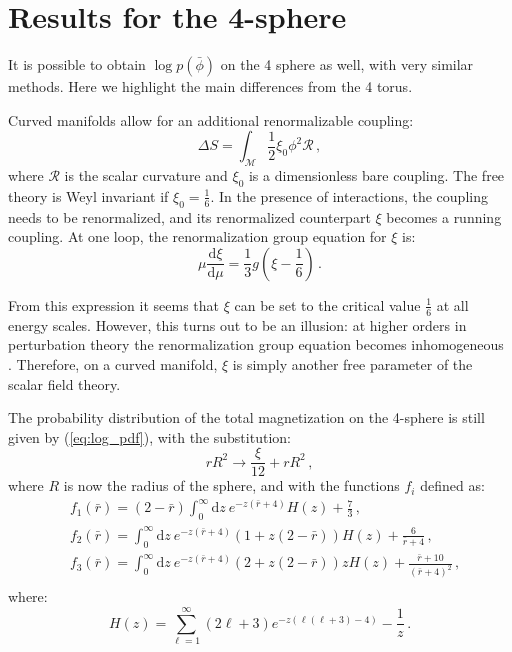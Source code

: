 \documentclass[11pt,a4paper]{article}
\newcommand{\dd}{\mathrm{d}}
\begin{document}
\section{Results for the 4-sphere}
\label{sec:four_sphere}
It is possible to obtain $\log p(\bar{\phi})$ on the 4 sphere as well, with
very similar methods. Here we highlight the main differences from the 4 torus.

Curved manifolds allow for an additional renormalizable coupling: 
\begin{equation}
    \Delta S = \int_{\mathcal{M}} \frac{1}{2}\xi_0 \phi^2 \mathcal{R}\,,
\end{equation}
where $\mathcal{R}$ is the scalar curvature and $\xi_0$ is a dimensionless bare
coupling.  The free theory is Weyl invariant if $\xi_0 = \frac{1}{6}$. In the
presence of interactions, the coupling needs to be renormalized, and its
renormalized counterpart $\xi$ becomes a running coupling. At one loop, the
renormalization group equation for $\xi$ is:
\begin{equation}
    \mu \frac{\dd \xi}{\dd \mu} =  \frac{1}{3} g \left(\xi - \frac{1}{6}\right)\,.
\end{equation}

From this expression it seems that $\xi$ can be set to the critical value
$\frac{1}{6}$ at all energy scales. However, this turns out to be an illusion:
at higher orders in perturbation theory the renormalization group equation
becomes inhomogeneous \cite{Brown1980}. Therefore, on a curved manifold, $\xi$
is simply another free parameter of the scalar field theory.

The probability distribution of the total magnetization on the 4-sphere is
still given by (\ref{eq:log_pdf}), with the substitution:
\begin{equation}
    rR^2 \to \frac{\xi}{12} + r R^2\,,
\end{equation}
where $R$ is now the radius of the sphere, and with the functions $f_i$ defined
as:
\begin{align}
    &f_1(\bar{r}) = (2 - \bar{r})\int_{0}^{\infty} \dd z\ e^{-z(\bar{r} + 4)} H(z) + \frac{7}{3}\,,\\
    &f_2(\bar{r}) = \int_{0}^{\infty} \dd z\ e^{-z(\bar{r} + 4)} 
    \left(1 + z (2 - \bar{r})\right) H(z) + \frac{6}{\bar{r} + 4}\,,\\
    &f_3(\bar{r}) = \int_{0}^{\infty} \dd z\ e^{-z(\bar{r} + 4)} 
    \left(2 + z (2 - \bar{r})\right)z H(z) + \frac{\bar{r} + 10 }{(\bar{r} + 4)^2}\,,\\
\end{align}
where:
\begin{equation}
    H(z) = \sum_{\ell = 1}^{\infty} (2\ell + 3)e^{-z (\ell(\ell + 3) - 4)} - \frac{1}{z}\,.
\end{equation}
\end{document}
